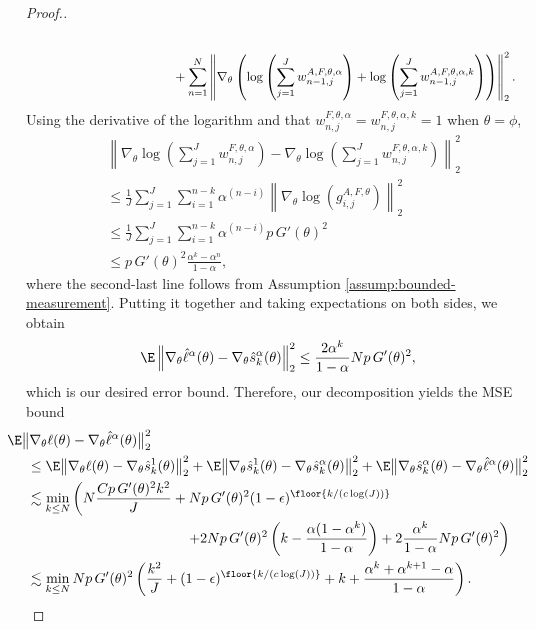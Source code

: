 \begin{proof}[Proof.]
\begin{align}
    \nonumber \\
    & \hspace{40mm}
    +\sum_{n=1}^N \left\lVert\nabla_\theta \left(\log\left(\sum_{j=1}^Jw_{n-1,j}^{A, F,\theta, \alpha}\right) + \log\left(\sum_{j=1}^Jw_{n-1,j}^{A, F,\theta,\alpha, k}\right)\right)\right\rVert_2^2.
\end{align}
Using the derivative of the logarithm and that $w_{n,j}^{F,\theta,\alpha} = w_{n,j}^{F,\theta,\alpha,k} = 1$ when $\theta=\phi$,
\begin{align}
    &\left\lVert\nabla_\theta\log\left(\sum_{j=1}^J w_{n,j}^{F,\theta,\alpha}\right)-\nabla_\theta\log\left(\sum_{j=1}^J w_{n,j}^{F,\theta,\alpha,k}\right)\right\rVert_2^2\\
    &\leq \frac{1}{J}\sum_{j=1}^J \sum_{i=1}^{n-k}\alpha^{(n-i)}\left\lVert\nabla_\theta\log\left(g_{i,j}^{A,F,\theta} \right)\right\rVert_2^2\\
    &\leq \frac{1}{J}\sum_{j=1}^J \sum_{i=1}^{n-k}\alpha^{(n-i)}p \, G'(\theta)^2\\
    &\leq p \, G'(\theta)^2\frac{\alpha^k-\alpha^n}{1-\alpha},
\end{align}
where the second-last line follows from Assumption \ref{assump:bounded-measurement}. Putting it together and taking expectations on both sides, we obtain
\begin{equation}
\E\left\lVert\nabla_\theta\hat\ell^\alpha(\theta) - \nabla_\theta \hat s_k^\alpha(\theta) \right\rVert_2^2 \leq  \frac{2\alpha^k}{1-\alpha}Np \, G'(\theta)^2,
\end{equation}
which is our desired error bound. 
Therefore, our decomposition yields the MSE bound
\begin{align}
    & \hspace{-5mm}
    \E\big\|\nabla_\theta\ell(\theta) - \nabla_\theta \hat\ell^\alpha(\theta)\big\|_2^2 
    \nonumber \\
    &\leq \E\big\|\nabla_\theta\ell(\theta) - \nabla_\theta\hat s_k^1(\theta)\big\|_2^2 + \E\big\|\nabla_\theta\hat s_k^1(\theta) - \nabla_\theta\hat s_k^\alpha(\theta)\big\|_2^2 + \E\big\|\nabla_\theta\hat s_k^\alpha(\theta) -  \nabla_\theta\hat\ell^\alpha(\theta)\big\|_2^2 
    \\ \nonumber
    &\lesssim \min_{k \leq N} \left(N\frac{Cp \, G'(\theta)^2k^2}{J} + Np \, G'(\theta)^2(1-\epsilon)^{\floor{k/(c\log(J))}} \right.
    \\
    & \hspace{40mm} \left.
    + 2Np \, G'(\theta)^2\left(k-\frac{\alpha(1-\alpha^k)}{1-\alpha}\right) + 2\frac{\alpha^k}{1-\alpha}Np \, G'(\theta)^2\right) \\
    &\lesssim \min_{k \leq N} Np \, G'(\theta)^2\left(\frac{k^2}{J}+(1-\epsilon)^{\floor{k/(c\log(J))}}+k+\frac{\alpha^k  + \alpha^{k+1} - \alpha}{1-\alpha}\right).
\end{align}

\end{proof}

